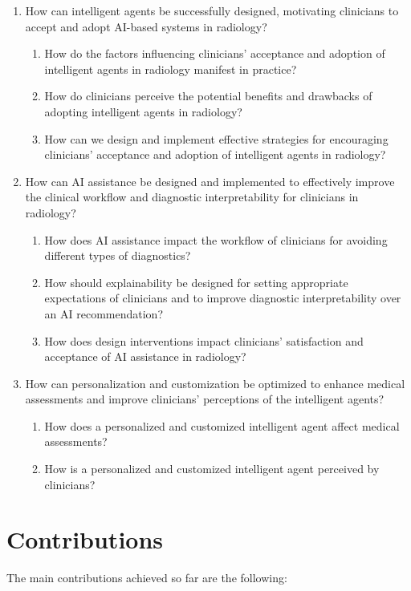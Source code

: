 \begin{enumerate}
\item How can intelligent agents be successfully designed, motivating clinicians to accept and adopt AI-based systems in radiology?
\begin{enumerate}
\item How do the factors influencing clinicians' acceptance and adoption of intelligent agents in radiology manifest in practice?
\item How do clinicians perceive the potential benefits and drawbacks of adopting intelligent agents in radiology?
\item How can we design and implement effective strategies for encouraging clinicians' acceptance and adoption of intelligent agents in radiology?
\end{enumerate}
\item How can AI assistance be designed and implemented to effectively improve the clinical workflow and diagnostic interpretability for clinicians in radiology?
\begin{enumerate}
\item How does AI assistance impact the workflow of clinicians for avoiding different types of diagnostics?
\item How should explainability be designed for setting appropriate expectations of clinicians and to improve diagnostic interpretability over an AI recommendation?
\item How does design interventions impact clinicians' satisfaction and acceptance of AI assistance in radiology?
\end{enumerate}
\item How can personalization and customization be optimized to enhance medical assessments and improve clinicians' perceptions of the intelligent agents?
\begin{enumerate}
\item How does a personalized and customized intelligent agent affect medical assessments?
\item How is a personalized and customized intelligent agent perceived by clinicians?
\end{enumerate}
\end{enumerate}

\section{Contributions}
\label{sec:chap001004}

The main contributions achieved so far are the following:

